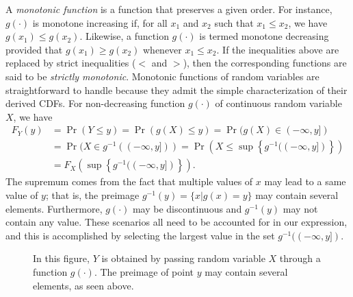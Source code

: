 A \emph{monotonic function} is a function that preserves a given order. 
For instance, $g(\cdot)$ is monotone increasing if, for all $x_1$ and $x_2$ such that $x_1 \leq x_2$, we have $g(x_1) \leq g(x_2)$.
Likewise, a function $g(\cdot)$ is termed monotone decreasing provided that $g(x_1) \geq g(x_2)$ whenever $x_1 \leq x_2$.
If the inequalities above are replaced by strict inequalities ($<$ and $>$), then the corresponding functions are said to be \emph{strictly monotonic}. 
Monotonic functions of random variables are straightforward to handle because they admit the simple characterization of their derived CDFs.
For non-decreasing function $g(\cdot)$ of continuous random variable $X$, we have
\begin{equation} \label{equation:MonotoneIncreasingCDF}
\begin{split}
F_Y(y) &= \Pr ( Y \leq y) = \Pr ( g(X) \leq y)
= \Pr ( g(X) \in (- \infty, y]) \\
&= \Pr ( X \in g^{-1} ( (- \infty, y] ) )
= \Pr \left( X \leq \sup \left\{ g^{-1} ( (- \infty, y] ) \right\} \right) \\
&= F_X \left( \sup \left\{ g^{-1} ( (- \infty, y] ) \right\} \right) .
\end{split}
\end{equation}
The supremum comes from the fact that multiple values of $x$ may lead to a same value of $y$; that is, the preimage $g^{-1}(y) = \{ x | g(x) = y \}$ may contain several elements.
Furthermore, $g(\cdot)$ may be discontinuous and $g^{-1} (y)$ may not contain any value.
These scenarios all need to be accounted for in our expression, and this is accomplished by selecting the largest value in the set $g^{-1} ( (- \infty, y] )$.

\begin{figure}[thb]
\begin{center}
\end{center}
\caption{In this figure, $Y$ is obtained by passing random variable $X$ through a function $g(\cdot)$.
The preimage of point $y$ may contain several elements, as seen above.}
\end{figure}

